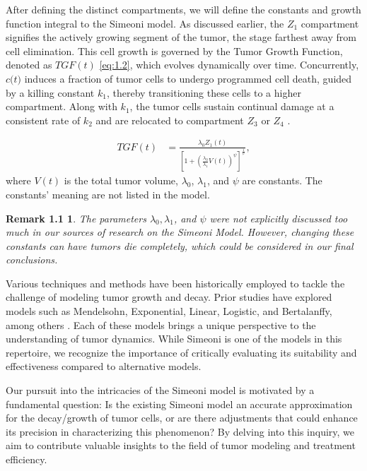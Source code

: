 \documentclass[11pt,reqno]{amsart}
\newtheorem*{remark}{Remark 1.1}
\begin{document}
After defining the distinct compartments, we will define the constants and growth function integral to the Simeoni model. As discussed earlier, the $Z_1$ compartment signifies the actively growing segment of the tumor, the stage farthest away from cell elimination. This cell growth is governed by the Tumor Growth Function, denoted as $TGF(t)$ \ref{eq:1.2}, which evolves dynamically over time. Concurrently, $c$$($$t$$)$ induces a fraction of tumor cells to undergo programmed cell death, guided by a killing constant 
$k_1$, thereby transitioning these cells to a higher compartment. Along with $k_1$,  the tumor cells sustain continual damage at a consistent rate of $k_2$ and are relocated to compartment $Z_3$ or $Z_4$ \cite{Koziol_Falls_Schnitzer_2020}.

\hspace{2em}

\begin{equation} \label{eq:1.2}
\begin{aligned}
    TGF(t) &= \frac{\lambda_0Z_1(t)}{[1 + (\frac{\lambda_0}{\lambda_1}V(t))^\psi]^\frac{1}{\psi}}, 
\end{aligned}
\tag*{(1.2)}
\end{equation}
\qquad where $V(t)$ is the total tumor volume, $\lambda_0$, $\lambda_1$, and $\psi$ are constants. The constants' meaning are not listed in the model. 

\begin{remark}
    The parameters $\lambda_0, \lambda_1$, and $\psi$ were not explicitly discussed too much in our sources of research on the Simeoni Model. However, changing these constants can have tumors die completely, which could be considered in our final conclusions.
\end{remark}


Various techniques and methods have been historically employed to tackle the challenge of modeling tumor growth and decay. Prior studies have explored models such as Mendelsohn, Exponential, Linear, Logistic, and Bertalanffy, among others \cite{Murphy_Hope_2016}. Each of these models brings a unique perspective to the understanding of tumor dynamics. While Simeoni is one of the models in this repertoire, we recognize the importance of critically evaluating its suitability and effectiveness compared to alternative models.

Our pursuit into the intricacies of the Simeoni model is motivated by a fundamental question: Is the existing Simeoni model an accurate approximation for the decay/growth of tumor cells, or are there adjustments that could enhance its precision in characterizing this phenomenon? By delving into this inquiry, we aim to contribute valuable insights to the field of tumor modeling and treatment efficiency.
\end{document}
